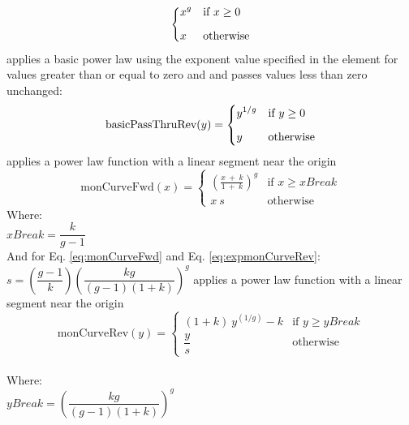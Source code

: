 \begin{xmlfields}
\begin{xmlfields}
\begin{equation}
					    \begin{dcases}
					        x^{g} & \text{if } x \geq 0 \\[6pt]
					        x & \text{otherwise}
					    \end{dcases}				\end{equation}			
			\xmlitemd["basicPassThruRev"] applies a basic power law using the exponent value specified in the  element for values greater than or equal to zero and and passes values less than zero unchanged:
				\begin{equation} \label{eq:expbasicPassThruRev}
					\text{basicPassThruRev}(y) = 
					    \begin{dcases}
					        y^{1/g} & \text{if } y \geq 0 \\[6pt]
					        y & \text{otherwise}
					    \end{dcases}
				\end{equation}				
			\xmlitemd["monCurveFwd"] applies a power law function with a linear segment near the origin
				\begin{equation} \label{eq:monCurveFwd}
					\text{monCurveFwd}(x) = 
					    \begin{cases}
					        \left( \frac{x\:+\:k}{1\:+\:k} \right)^{g} & \text{if } x \geq xBreak \\[8pt]
					        x\:s & \text{otherwise}
					    \end{cases}
				\end{equation}
				\tabto{0.5in} Where: \\[4pt]
                \tabto{1.0in} $xBreak = \dfrac{k}{g-1}$ \\[20pt]
                \tabto{0.5in} And for Eq. \ref{eq:monCurveFwd} and Eq. \ref{eq:expmonCurveRev}: \\[14pt]
                \tabto{1.0in} $s = \left(\dfrac{g-1}{k}\right)  \left(\dfrac{k g}{(g-1)(1+k)}\right)^{g}$
            \xmlitemd["monCurveRev"] applies a power law function with a linear segment near the origin 
				\begin{equation} \label{eq:expmonCurveRev}
					\text{monCurveRev}(y) = 
					    \begin{cases}
					        (1 + k)\:y^{(1/g)} - k & \text{if } y \geq yBreak \\[8pt]
					        \dfrac{y}{s} & \text{otherwise}
					    \end{cases}
				\end{equation} \\[4pt]
				\tabto{0.5in} Where: \\[4pt]
                \tabto{1.0in} $yBreak = \left(\dfrac{k g}{(g-1)(1+k)}\right)^g$ \\[26pt]
			

\end{xmlfields}
\end{xmlfields}
